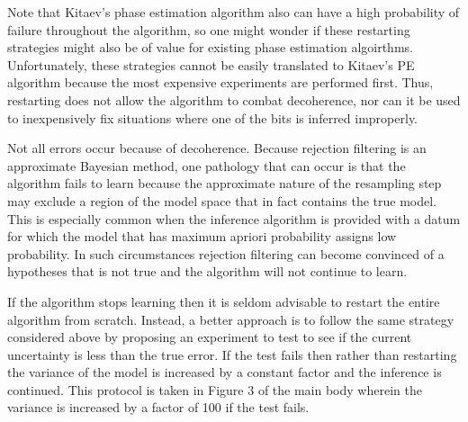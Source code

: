 \documentclass[aps,pra,amsmath,twocolumn,amssymb,superscriptaddress]{revtex4-1}
\begin{document}
Note that Kitaev's phase estimation algorithm also can have a high probability of failure throughout the algorithm, so one might wonder if these restarting strategies might also be of value for existing phase estimation algoirthms.  Unfortunately, these strategies cannot be easily translated to Kitaev's PE algorithm because the most expensive experiments are performed first.  Thus, restarting does not allow the algorithm to combat decoherence, nor can it be used to inexpensively fix situations where one of the bits is inferred improperly.

Not all errors occur because of decoherence.  Because rejection filtering is an approximate Bayesian method, one pathology that can occur is that the algorithm fails to learn because the approximate nature of the resampling step may exclude a region of the model space that in fact contains the true model.  This is especially common when the inference algorithm is provided with a datum for which the model that has maximum apriori probability assigns low probability.  In such circumstances rejection filtering can become convinced of a hypotheses that is not true and the algorithm will not continue to learn.  

If the algorithm stops learning then it is seldom advisable to restart the entire algorithm from scratch.  Instead, a better approach is to follow the same strategy considered above by proposing an experiment to test to see if the current uncertainty is less than the true error.  If the test fails then rather than restarting the variance of the model is increased by a constant factor and the inference is continued.  This protocol is taken in Figure 3 of the main body wherein the variance is increased by a factor of 100 if the test fails.
\end{document}
